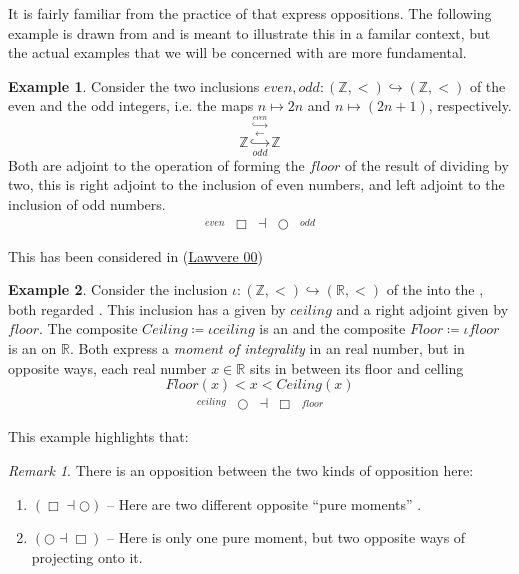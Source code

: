 \documentclass[12pt,titlepage]{article}
\newcommand{\itexarray}[1]{\begin{matrix}#1\end{matrix}}
\newcommand{\lt}{<}
\theoremstyle{plain}
\theoremstyle{definition}
\newtheorem{example}{Example}
\theoremstyle{remark}
\newtheorem{remark}{Remark}
\begin{document}
It is fairly familiar from the practice of  that  express oppositions. The following example is drawn from  and is meant to illustrate this in a familar context, but the actual examples that we will be concerned with are more fundamental.
\begin{example}
\label{}\hypertarget{}{}
Consider the two inclusions $even, odd \colon (\mathbb{Z},\lt ) \hookrightarrow (\mathbb{Z},\lt)$ of the even and the odd integers, i.e. the maps $n \mapsto 2 n$ and $n \mapsto (2n+1)$, respectively.
\begin{displaymath}
\mathbb{Z}
\stackrel{\overset{even}{\hookrightarrow}}{\stackrel{\longleftarrow}{\underset{odd}{\hookrightarrow}}}
\mathbb{Z}
\end{displaymath}
Both are adjoint to the operation of forming the $floor$ of the result of dividing by two, this is right adjoint to the inclusion of even numbers, and left adjoint to the inclusion of odd numbers.
\begin{displaymath}
\itexarray{
\stackrel{even}{} & \Box &\dashv& \bigcirc & \stackrel{odd}{}
}
\end{displaymath}
\end{example}
This has been considered in (\href{http://ncatlab.org/nlab/show/Aufhebung#Law00}{Lawvere 00})
\begin{example}
\label{}\hypertarget{}{}
Consider the inclusion $\iota \colon (\mathbb{Z}, \lt) \hookrightarrow (\mathbb{R}, \lt)$ of the  into the , both regarded . This inclusion has a  given by $ceiling$ and a right adjoint given by $floor$. The composite $Ceiling \coloneqq \iota ceiling$ is an  and the composite $Floor \coloneqq \iota floor$ is an  on $\mathbb{R}$. Both express a \emph{moment of integrality} in an real number, but in opposite ways, each real number $x\in \mathbb{R}$ sits in between its floor and celling
\begin{displaymath}
Floor(x) \lt x \lt Ceiling(x)
\end{displaymath}
\begin{displaymath}
\itexarray{
\stackrel{ceiling}{} &\bigcirc &\dashv& \Box & \stackrel{floor}{}
}
\end{displaymath}
\end{example}
This example highlights that:
\begin{remark}
\label{TheTwoKindsOfOpposites}\hypertarget{TheTwoKindsOfOpposites}{}
There is an opposition between the two kinds of opposition here:
\begin{enumerate}%
\item $(\Box \dashv \bigcirc)$ -- Here are two different opposite ``pure moments'' .
\item $(\bigcirc \dashv \Box)$ -- Here is only one pure moment, but two opposite ways of projecting onto it.
\end{enumerate}
\end{remark}
\end{document}
